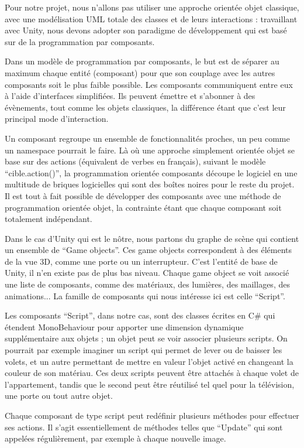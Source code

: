 Pour notre projet, nous n'allons pas utiliser une approche orientée objet classique, avec une modélisation UML totale des classes et de leurs interactions : travaillant avec Unity, nous devons adopter son paradigme de développement qui est basé sur de la programmation par composants.

Dans un modèle de programmation par composants, le but est de séparer au maximum chaque entité (composant) pour que son couplage avec les autres composants soit le plus faible possible. Les composants communiquent entre eux à l'aide d'interfaces simplifiées. Ils peuvent émettre et s'abonner à des évènements, tout comme les objets classiques, la différence étant que c'est leur principal mode d'interaction.

Un composant regroupe un ensemble de fonctionnalités proches, un peu comme un namespace pourrait le faire. Là où une approche simplement orientée objet se base sur des actions (équivalent de verbes en français), suivant le modèle \enquote{cible.action()}, la programmation orientée composants découpe le logiciel en une multitude de briques logicielles qui sont des boîtes noires pour le reste du projet. Il est tout à fait possible de développer des composants avec une méthode de programmation orientée objet, la contrainte étant que chaque composant soit totalement indépendant.

Dans le cas d'Unity qui est le nôtre, nous partons du graphe de scène qui contient un ensemble de \enquote{Game objects}. Ces game objects correspondent à des éléments de la vue 3D, comme une porte ou un interrupteur. C'est l'entité de base de Unity, il n'en existe pas de plus bas niveau. Chaque game object se voit associé une liste de composants, comme des matériaux, des lumières, des maillages, des animations... La famille de composants qui nous intéresse ici est celle \enquote{Script}.

Les composants \enquote{Script}, dans notre cas, sont des classes écrites en C\# qui étendent MonoBehaviour pour apporter une dimension dynamique supplémentaire aux objets ; un objet peut se voir associer plusieurs scripts. On pourrait par exemple imaginer un script qui permet de lever ou de baisser les volets, et un autre permettant de mettre en valeur l'objet activé en changeant la couleur de son matériau. Ces deux scripts peuvent être attachés à chaque volet de l'appartement, tandis que le second peut être réutilisé tel quel pour la télévision, une porte ou tout autre objet.

Chaque composant de type script peut redéfinir plusieurs méthodes pour effectuer ses actions. Il s'agit essentiellement de méthodes telles que \enquote{Update} qui sont appelées régulièrement, par exemple à chaque nouvelle image.

